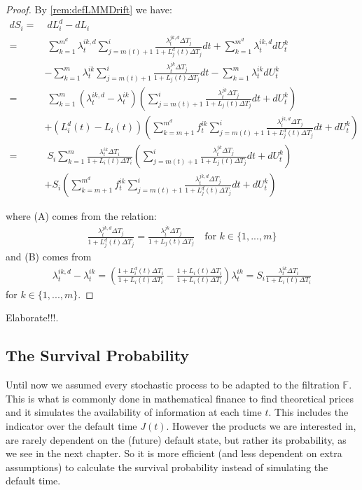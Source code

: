 \documentclass[12pt]{article}
\begin{document}
	\begin{proof}
		By \cref{rem:defLMMDrift} we have:
		\begin{align*}
			dS_i =&\; dL^d_i - dL_i\\
			=&\; \sum_{k=1}^{m^d}\lambda^{i k,d}_t \sum_{j=m(t)+1}^{i}\frac{\lambda^{j k,d}_t \Delta T_j}{1 + L^d_j(t) \Delta T_j} dt + \sum_{k=1}^{m^d}\lambda^{i k,d}_tdU^k_t 
			\\
			&- \sum_{k=1}^{m}\lambda^{i k}_t \sum_{j=m(t)+1}^{i}\frac{\lambda^{j k}_t \Delta T_j}{1 + L_j(t) \Delta T_j} dt - \sum_{k=1}^{m}\lambda^{i k}_t dU^k_t\\
			=&\; \sum_{k=1}^{m}\left(\lambda^{i k,d}_t - \lambda^{i k}_t\right)\left( \sum_{j=m(t)+1}^{i}\frac{\lambda^{j k}_t \Delta T_j}{1 + L_j(t) \Delta T_j} dt + dU^k_t\right)
			\tag{A}\\
			&+ \left(L^d_i(t) - L_i(t)\right)\left(\sum_{k=m + 1}^{m^d}f^{i k}_t \sum_{j=m(t)+1}^{i}\frac{\lambda^{j k, d}_t \Delta T_j}{1 + L^d_j(t) \Delta T_j} dt + dU^k_t\right)\\
			=&\; S_i\sum_{k=1}^{m}\frac{\lambda^{i k}_t \Delta T_i}{1 + L_i(t)\Delta T_i}\left( \sum_{j=m(t)+1}^{i}\frac{\lambda^{j k}_t \Delta T_j}{1 + L_j(t) \Delta T_j} dt + dU^k_t\right)
			\tag{B}\\
			&+ S_i\left(\sum_{k=m + 1}^{m^d}f^{i k}_t \sum_{j=m(t)+1}^{i}\frac{\lambda^{j k, d}_t \Delta T_j}{1 + L^d_j(t) \Delta T_j} dt + dU^k_t\right)
		\end{align*}
		
		where (A) comes from the relation:
		\begin{align*}
			\frac{\lambda^{j k, d}_t \Delta T_j}{1 + L^d_j(t) \Delta T_j} = \frac{\lambda^{j k}_t \Delta T_j}{1 + L_j(t) \Delta T_j} \quad \text{for } k \in \{1, ..., m\}
		\end{align*}
		and (B) comes from
		\begin{align*}
			\lambda^{i k,d}_t - \lambda^{i k}_t = \left(\frac{1 + L^d_i(t) \Delta T_i}{1 + L_i(t)\Delta T_i} - \frac{1 + L_i(t) \Delta T_i}{1 + L_i(t)\Delta T_i}\right)\lambda^{i k}_t = S_i \frac{\lambda^{i k}_t \Delta T_i}{1 + L_i(t) \Delta T_i}
		\end{align*}
		for $k \in \{1, ..., m\}$.
	\end{proof}
	
	 \color{red}Elaborate!!!\color{black}. 
	
	
	\subsection{The Survival Probability}
	Until now we assumed every stochastic process to be adapted to the filtration $\mathbb{F}$. This is what is commonly done in mathematical finance to find theoretical prices and it simulates the availability of  information at each time $t$. This includes the indicator over the default time $J(t)$. However the products we are interested in, are rarely dependent on the (future) default state, but rather its probability, as we see in the next chapter. So it is more efficient (and less dependent on extra assumptions) to calculate the survival probability instead of simulating the default time.\\
	
\end{document}
